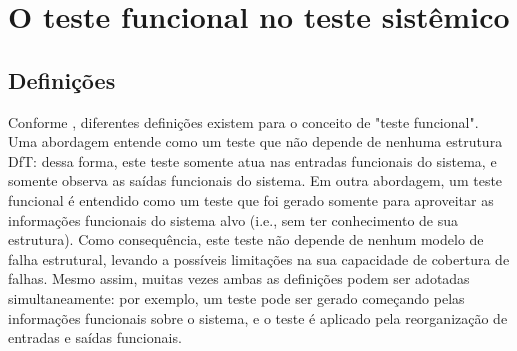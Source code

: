 \chapter{O teste funcional no teste sistêmico}

	\section{Definições}
		Conforme \citet{jutman2014high}, diferentes definições existem para o conceito de "teste funcional". Uma abordagem entende como um teste que não depende de nenhuma estrutura DfT: dessa forma, este teste somente atua nas entradas funcionais do sistema, e somente observa as saídas funcionais do sistema.
		Em outra abordagem, um teste funcional é entendido como um teste que foi gerado somente para aproveitar as informações funcionais do sistema alvo (i.e., sem ter conhecimento de sua estrutura). Como consequência, este teste não depende de nenhum modelo de falha estrutural, levando a possíveis limitações na sua capacidade de cobertura de falhas.
		Mesmo assim, muitas vezes ambas as definições podem ser adotadas simultaneamente: por exemplo, um teste pode ser gerado começando pelas informações funcionais sobre o sistema, e o teste é aplicado pela reorganização de entradas e saídas funcionais.

